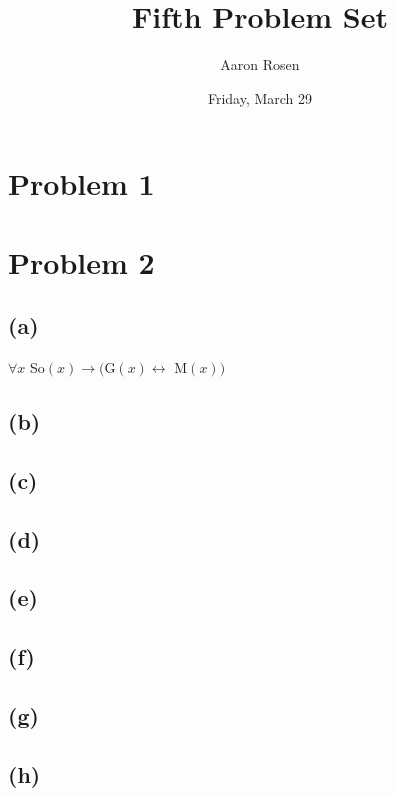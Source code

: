 \documentclass[11pt, a4paper, oneside]{article}
\begin{document}
\title{Fifth Problem Set}
\author{Aaron Rosen}
\date{Friday, March 29}
\maketitle

\section*{Problem 1}

\section*{Problem 2}
\subsection*{(a)}
$\forall x$ So$(x) \to ($G$(x) \leftrightarrow$ M$(x))$
\subsection*{(b)}

\subsection*{(c)}

\subsection*{(d)}

\subsection*{(e)}

\subsection*{(f)}

\subsection*{(g)}

\subsection*{(h)}
\end{document}
